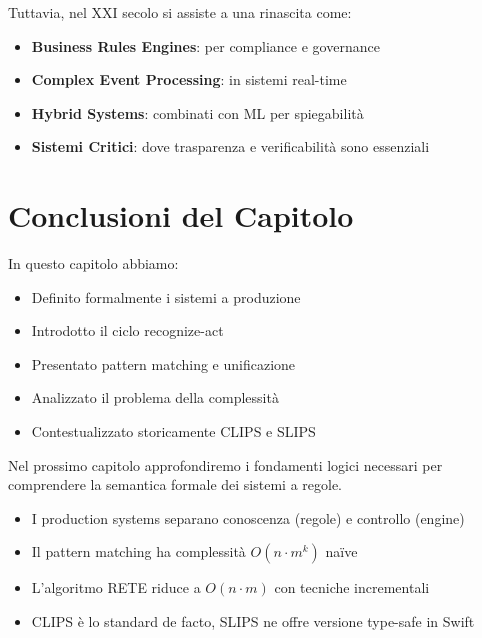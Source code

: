 Tuttavia, nel XXI secolo si assiste a una rinascita come:
\begin{itemize}
\item \textbf{Business Rules Engines}: per compliance e governance
\item \textbf{Complex Event Processing}: in sistemi real-time
\item \textbf{Hybrid Systems}: combinati con ML per spiegabilità
\item \textbf{Sistemi Critici}: dove trasparenza e verificabilità sono essenziali
\end{itemize}

\section{Conclusioni del Capitolo}

In questo capitolo abbiamo:

\begin{itemize}
\item Definito formalmente i sistemi a produzione
\item Introdotto il ciclo recognize-act
\item Presentato pattern matching e unificazione
\item Analizzato il problema della complessità
\item Contestualizzato storicamente CLIPS e SLIPS
\end{itemize}

Nel prossimo capitolo approfondiremo i fondamenti logici necessari per comprendere la semantica formale dei sistemi a regole.

\vspace{1cm}

\begin{successbox}
\begin{itemize}
\item I production systems separano conoscenza (regole) e controllo (engine)
\item Il pattern matching ha complessità $O(n \cdot m^k)$ naïve
\item L'algoritmo RETE riduce a $O(n \cdot m)$ con tecniche incrementali
\item CLIPS è lo standard de facto, SLIPS ne offre versione type-safe in Swift
\end{itemize}
\end{successbox}

